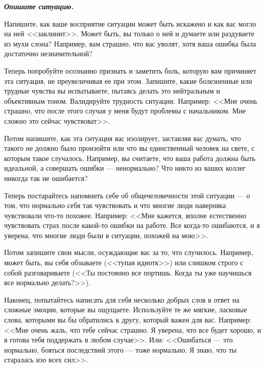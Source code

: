 \vspace{2ex}

\textbf{\textit{Опишите ситуацию.}}

\vfill

Напишите, как ваше восприятие ситуации может быть искажено и как вас могло на ней <<заклинит>>. Может быть, вы только о ней и думаете или раздуваете из мухи слона? Например, вам страшно, что вас уволят, хотя ваша ошибка была достаточно незначительной?

\vfill


\newpage


Теперь попробуйте осознанно признать и заметить боль, которую вам причиняет эта ситуация, не преувеличивая ее при этом. Запишите, какие болезненные или трудные чувства вы испытываете, пытаясь делать это нейтральным и объективным тоном. Валидируйте трудность ситуации. Например: <<Мне очень страшно, что после этого случая у меня будут проблемы с начальником.  Мне сложно это сейчас чувствоват>>.

\vfill

Потом напишите, как эта ситуация вас изолирует, заставляя вас думать, что такого не должно было произойти или что вы единственный человек на свете, с которым такое случалось. Например, вы считаете, что ваша работа должна быть идеальной, а совершать ошибки --- ненормально? Что никто из ваших коллег никогда так не ошибается?

\vfill


\newpage


Теперь постарайтесь напомнить себе об общечеловечности этой ситуации --- о том, что нормально себя так чувствовать и что многие люди наверняка чувствовали что-то похожее. Например: <<Мне кажется, вполне естественно чувствовать страх после какой-то ошибки на работе. Все когда-то ошибаются, и я уверена, что многие люди были в ситуации, похожей на мою>>.

\vfill

Потом запишите свои мысли, осуждающие вас за то, что случилось. Например, может быть, вы себя обзываете (<<тупая идиотк>>) или слишком строго с собой разговариваете (<<Ты постоянно все портишь. Когда ты уже научишься все нормально делать?>>).

\vfill


\newpage


Наконец, попытайтесь написать для себя несколько добрых слов в ответ на сложные эмоции, которые вы ощущаете. Используйте те же мягкие, ласковые слова, которыми вы бы обратились к другу, который важен для вас. Например: <<Мне очень жаль, что тебе сейчас страшно. Я уверена, что все будет хорошо, и я готова тебя поддержать в любом случае>>. Или: <<Ошибаться --- это нормально, бояться последствий этого --- тоже нормально. Я знаю, что ты старалась изо всех сил>>.


